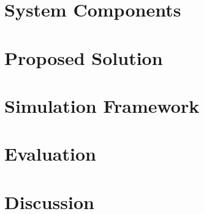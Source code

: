 \documentclass[letterpaper, 10 pt, conference]{Format/ieeeconf}  %
\begin{document}
\section{System Components}
\label{section:Pipeline}


\section{Proposed Solution}
\label{section:solution}


\section{Simulation Framework}
\label{section:simulation}


\section{Evaluation}
\label{section:evaluation}


\section{Discussion}
\label{section:discussion}




\end{document}
